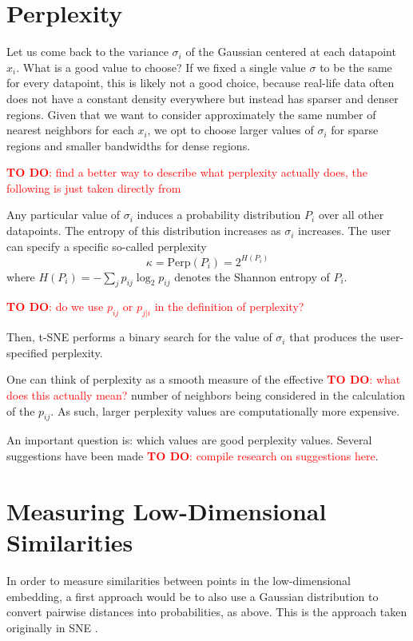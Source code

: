 \section{Perplexity}
Let us come back to the variance $\sigma_i$ of the Gaussian centered at each datapoint $x_i$. What is a good value to choose? 
If we fixed a single value $\sigma$ to be the same for every datapoint, this is likely not a good choice, because real-life data often does not have a constant density everywhere but instead has sparser and denser regions. 
Given that we want to consider approximately the same number of nearest neighbors for each $x_i$, we opt to choose larger values of $\sigma_i$ for sparse regions and smaller bandwidths for dense regions. 

\textcolor{red}{\textbf{TO DO}: find a better way to describe what perplexity actually does, the following is just taken directly from \cite{vdMaa08}}

Any particular value of $\sigma_i$ induces a probability distribution $P_i$ over all other datapoints. 
The entropy of this distribution increases as $\sigma_i$ increases. 
The user can specify a specific so-called perplexity
\begin{equation}
    \kappa = \text{Perp}(P_i) = 2^{H(P_i)} 
\end{equation}
where $H(P_i) = -\sum_{j} p_{ij} \log_2 p_{ij}$ denotes the Shannon entropy of $P_i$. 

\textcolor{red}{\textbf{TO DO}: do we use $p_{ij}$ or $p_{j|i}$ in the definition of perplexity?}

Then, t-SNE performs a binary search for the value of $\sigma_i$ that produces the user-specified perplexity. 

One can think of perplexity as a smooth measure of the effective \textcolor{red}{\textbf{TO DO}: what does this actually mean?} number of neighbors being considered in the calculation of the $p_{ij}$. As such, larger perplexity values are computationally more expensive. 

An important question is: which values are good perplexity values. Several suggestions have been made \textcolor{red}{\textbf{TO DO}: compile research on suggestions here}. 

\section{Measuring Low-Dimensional Similarities}
In order to measure similarities between points in the low-dimensional embedding, a first approach would be to also use a Gaussian distribution to convert pairwise distances into probabilities, as above. This is the approach taken originally in SNE \cite{Hinton02}.


